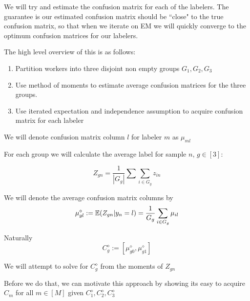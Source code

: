 We will try and estimate the confusion matrix for each of the labelers. The
guarantee is our estimated confusion matrix should be ``close" to the true
confusion matrix, so that when we iterate on EM we will quickly converge to the
optimum confusion matrices for our labelers.

The high level overview of this is as follows:

\begin{enumerate}
\item Partition workers into three disjoint non empty groups $G_{1},G_{2}, G_{3}$
\item Use method of moments to estimate average confusion matrices for the three groups.
\item Use iterated expectation and independence assumption to acquire confusion matrix for each labeler
\end{enumerate}

We will denote confusion matrix column $l$ for labeler $m$ as $\mu_{ml}$

For each group we will calculate the average label for sample $n$, $g \in [3]$:

\begin{equation}
Z_{gn} = \frac{1}{|G_{g}|} \displaystyle\sum\limits\sum_{i \in G_{g}} z_{in}
\end{equation}


We will denote the average confusion matrix columns by
\begin{equation}
\mu^{\diamond}_{gl} := \mathbb{E}(Z_{gn} | y_{n} = l) = \frac{1}{G_{g}} \displaystyle\sum\limits_{i \in G_{g}} \mu_{il}
\end{equation}

Naturally
\begin{equation}
C^{\diamond}_{g} := [\mu^{\diamond}_{g0},\mu^{\diamond}_{g1}]
\end{equation}

We will attempt to solve for $C^{\diamond}_{g}$ from the moments of $Z_{gn}$

Before we do that, we can motivate this approach by showing its easy to acquire $C_{m}$ for all $m \in [M]$  given $C^{\diamond}_{1},C^{\diamond}_{2},C^{\diamond}_{3}$


